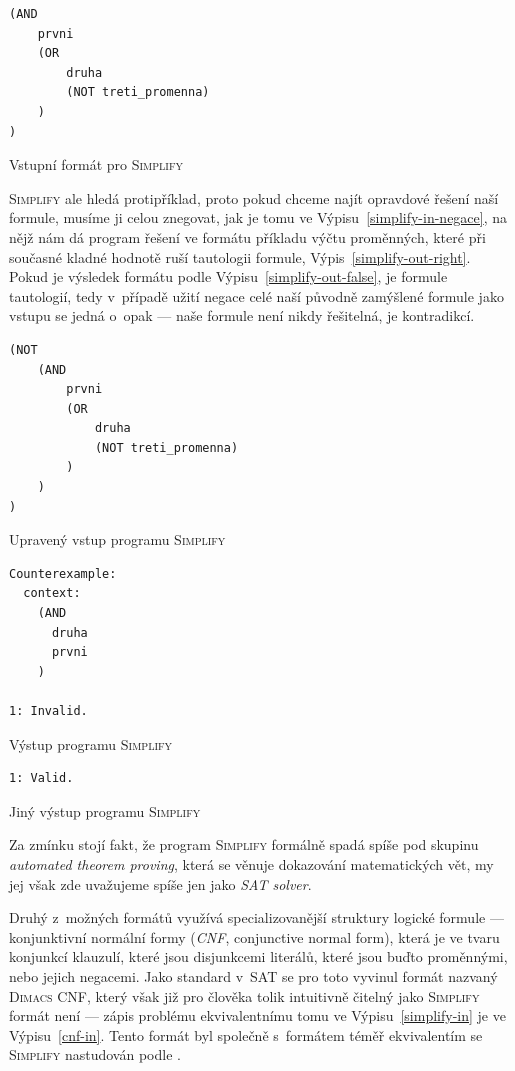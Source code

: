 \documentclass[11pt, titlepage]{report}
\begin{document}
\begin{output}
\begin{verbatim}
(AND
    prvni
    (OR
        druha
        (NOT treti_promenna)
    )
)
\end{verbatim}
\caption{Vstupní formát pro \textsc{Simplify}}
\label{simplify-in}
\end{output}

\newpage \textsc{Simplify} ale hledá protipříklad, proto pokud chceme najít opravdové řešení naší formule, musíme ji celou znegovat, jak je tomu ve Výpisu~\ref{simplify-in-negace}, na nějž nám dá program řešení ve formátu příkladu výčtu proměnných, které při současné kladné hodnotě ruší tautologii formule, Výpis~\ref{simplify-out-right}. Pokud je výsledek formátu podle Výpisu~\ref{simplify-out-false}, je formule tautologií, tedy v~případě užití negace celé naší původně zamýšlené formule jako vstupu se jedná o~opak --- naše formule není nikdy řešitelná, je kontradikcí.

\begin{output}
\begin{verbatim}
(NOT
    (AND
        prvni
        (OR
            druha
            (NOT treti_promenna)
        )
    )
)
\end{verbatim}
\caption{Upravený vstup programu \textsc{Simplify}}
\label{simplify-in-negace}
\end{output}

\begin{output}
\begin{verbatim}
Counterexample:
  context:
    (AND
      druha
      prvni
    )

1: Invalid.
\end{verbatim}
\caption{Výstup programu \textsc{Simplify}}
\label{simplify-out-right}
\end{output}

\begin{output}
\begin{verbatim}
1: Valid.
\end{verbatim}
\caption{Jiný výstup programu \textsc{Simplify}}
\label{simplify-out-false}
\end{output}

\newpage Za zmínku stojí fakt, že program \textsc{Simplify} formálně spadá spíše pod skupinu \emph{automated theorem proving}, která se věnuje dokazování matematických vět, my jej však zde uvažujeme spíše jen jako \emph{SAT solver}.

Druhý z~možných formátů využívá specializovanější struktury logické formule --- konjunktivní normální formy (\emph{CNF}, conjunctive normal form), která je ve tvaru konjunkcí klauzulí, které jsou disjunkcemi literálů, které jsou buďto proměnnými, nebo jejich negacemi. Jako standard v~SAT se pro toto vyvinul formát nazvaný \textsc{Dimacs CNF}, který však již pro člověka tolik intuitivně čitelný jako \textsc{Simplify} formát není --- zápis problému ekvivalentnímu tomu ve Výpisu~\ref{simplify-in} je ve Výpisu~\ref{cnf-in}. Tento formát byl společně s~formátem téměř ekvivalentím se \textsc{Simplify} nastudován podle \cite{sat-formats}.
\end{document}
